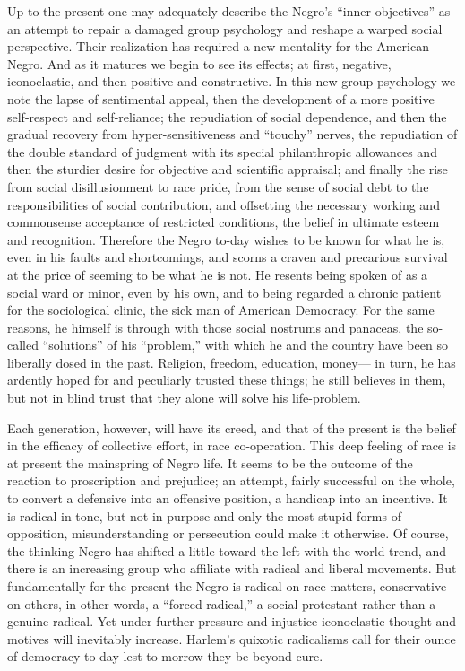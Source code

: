 \documentclass[12pt]{article}
\begin{document}
Up to the present one may adequately describe the Negro's ``inner objectives'' as an attempt to repair a damaged group psychology and reshape a warped social perspective. Their realization has required a new mentality for the American Negro. And as it matures we begin to see its effects; at first, negative, iconoclastic, and then positive and constructive. In this new group psychology we note the lapse of sentimental appeal, then the development of a more positive self-respect and self-reliance; the repudiation of social dependence, and then the gradual recovery from hyper-sensitiveness and ``touchy'' nerves, the repudiation of the double standard of judgment with its special philanthropic allowances and then the sturdier desire for objective and scientific appraisal; and finally the rise from social disillusionment to race pride, from the sense of social debt to the responsibilities of social contribution, and offsetting the necessary working and commonsense acceptance of restricted conditions, the belief in ultimate esteem and recognition. Therefore the Negro to-day wishes to be known for what he is, even in his faults and shortcomings, and scorns a craven and precarious survival at the price of seeming to be what he is not. He resents being spoken of as a social ward or minor, even by his own, and to being regarded a chronic patient for the sociological clinic, the sick man of American Democracy. For the same reasons, he himself is through with those social nostrums and panaceas, the so-called ``solutions'' of his ``problem,'' with which he and the country have been so liberally dosed in the past. Religion, freedom, education, money--- in turn, he has ardently hoped for and peculiarly trusted these things; he still believes in them, but not in blind trust that they alone will solve his life-problem.

Each generation, however, will have its creed, and that of the present is the belief in the efficacy of collective effort, in race co-operation. This deep feeling of race is at present the mainspring of Negro life. It seems to be the outcome of the reaction to proscription and prejudice; an attempt, fairly successful on the whole, to convert a defensive into an offensive position, a handicap into an incentive. It is radical in tone, but not in purpose and only the most stupid forms of opposition, misunderstanding or persecution could make it otherwise. Of course, the thinking Negro has shifted a little toward the left with the world-trend, and there is an increasing group who affiliate with radical and liberal movements. But fundamentally for the present the Negro is radical on race matters, conservative on others, in other words, a ``forced radical,'' a social protestant rather than a genuine radical. Yet under further pressure and injustice iconoclastic thought and motives will inevitably increase. Harlem's quixotic radicalisms call for their ounce of democracy to-day lest to-morrow they be beyond cure.
\end{document}
